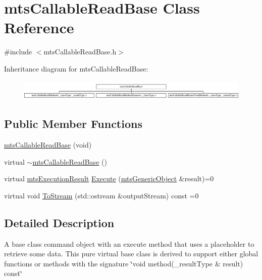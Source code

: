 \hypertarget{classmts_callable_read_base}{}\section{mts\+Callable\+Read\+Base Class Reference}
\label{classmts_callable_read_base}


{\ttfamily \#include $<$mts\+Callable\+Read\+Base.\+h$>$}

Inheritance diagram for mts\+Callable\+Read\+Base\+:\begin{figure}[H]
\begin{center}
\leavevmode
\includegraphics[height=0.972222cm]{d3/d9b/classmts_callable_read_base}
\end{center}
\end{figure}
\subsection*{Public Member Functions}
\begin{DoxyCompactItemize}
\item 
\hyperlink{classmts_callable_read_base_a2e41f1bfecb9bda1ca5e0d0ee10f3a0e}{mts\+Callable\+Read\+Base} (void)
\item 
virtual \hyperlink{classmts_callable_read_base_a46a1b8f36181396ab482e3e0fa7f8e72}{$\sim$mts\+Callable\+Read\+Base} ()
\item 
virtual \hyperlink{classmts_execution_result}{mts\+Execution\+Result} \hyperlink{classmts_callable_read_base_ab5dbf9b7df75841d7f0a48fa40358d5f}{Execute} (\hyperlink{classmts_generic_object}{mts\+Generic\+Object} \&result)=0
\item 
virtual void \hyperlink{classmts_callable_read_base_a934fc1fadbf9bedcbfd5f498a07a4160}{To\+Stream} (std\+::ostream \&output\+Stream) const =0
\end{DoxyCompactItemize}


\subsection{Detailed Description}
A base class command object with an execute method that uses a placeholder to retrieve some data. This pure virtual base class is derived to support either global functions or methods with the signature \char`\"{}void method(\+\_\+result\+Type \& result) const\char`\"{} 

